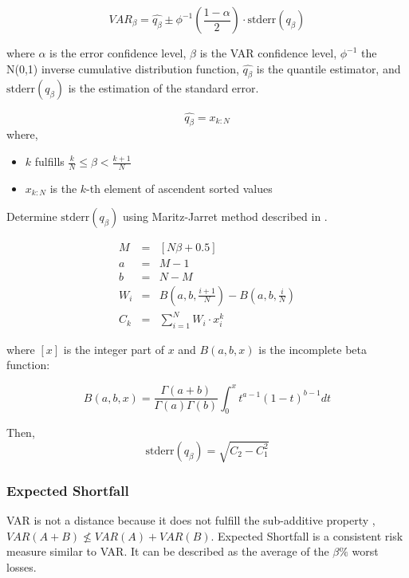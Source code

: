 \documentclass[a4paper,12pt,final]{article}
\begin{document}
\begin{displaymath}
VAR_{\beta} = \widehat{q_{\beta}} \pm \phi^{-1}\left(\frac{1-\alpha}{2}\right) \cdot \textrm{stderr}(q_{\beta})
\end{displaymath}

where $\alpha$ is the error confidence level, $\beta$ is the VAR confidence 
level, $\phi^{-1}$ the N(0,1) inverse cumulative distribution function, 
$\widehat{q_{\beta}}$ is the quantile estimator, and $\textrm{stderr}(q_{\beta})$
is the estimation of the standard error.

\begin{displaymath}
\widehat{q_{\beta}} = x_{k:N}
\end{displaymath}
where,
\begin{itemize}
\item $k$ fulfills $\frac{k}{N} \leq \beta < \frac{k+1}{N}$
\item $x_{k:N}$ is the $k$-th element of ascendent sorted values
\end{itemize}

Determine $\textrm{stderr}(q_{\beta})$ using Maritz-Jarret method described
in \cite{quant:algor}.

\begin{eqnarray}
M   & = & [N \beta + 0.5] \nonumber \\
a   & = & M - 1 \nonumber \\
b   & = & N - M \nonumber \\
W_i & = & B(a,b,\frac{i+1}{N}) - B(a,b,\frac{i}{N}) \nonumber \\
C_k & = & \sum_{i=1}^{N} W_i \cdot x_i^k \nonumber
\end{eqnarray}

where $[x]$ is the integer part of $x$ and $B(a,b,x)$ is the incomplete beta 
function:

\begin{displaymath}
B(a,b,x)=\frac{\Gamma(a+b)}{\Gamma(a)\Gamma(b)}\int_0^x t^{a-1} (1-t)^{b-1} dt
\end{displaymath}

Then,
\begin{displaymath}
\textrm{stderr}(q_{\beta}) = \sqrt{C_2 - C_1^2}
\end{displaymath}

\subsubsection{Expected Shortfall}
VAR is not a distance because it does not fulfill the sub-additive property 
\cite{var:varbad}, $VAR(A+B) \nleq VAR(A)+VAR(B)$. Expected Shortfall is a 
consistent risk measure \cite{var:eshortfall} similar to VAR. It can be described
as the average of the $\beta\%$ worst losses.
\end{document}
